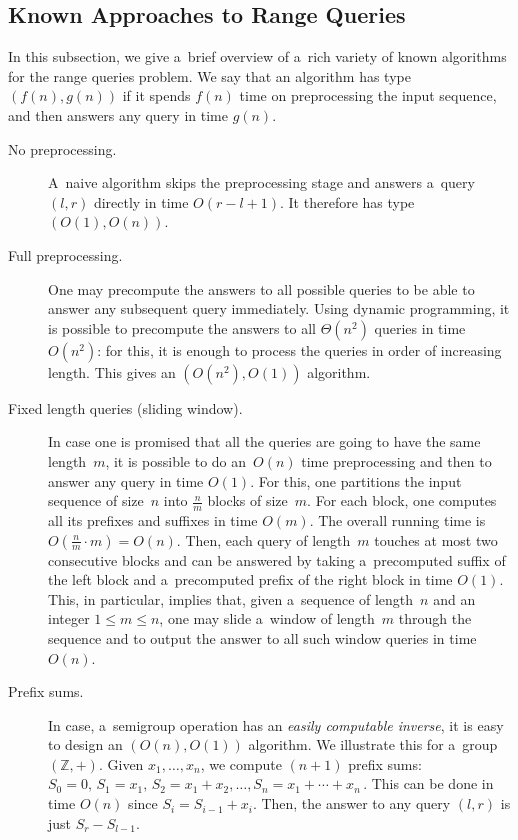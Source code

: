 \subsection{Known Approaches to Range Queries}\label{subsec:approaches}
In this subsection, we give a~brief overview of a~rich variety of known algorithms for the range queries problem. We say that an algorithm has type $(f(n), g(n))$ if it spends $f(n)$ time on preprocessing the input sequence, and then answers any query in time $g(n)$.

\begin{description}
\item[No preprocessing.] A~naive algorithm skips the preprocessing stage and answers a~query $(l,r)$ directly in time $O(r-l+1)$. It therefore has type $(O(1), O(n))$.

\item[Full preprocessing.] One may precompute the answers to all possible queries to be able to answer any subsequent query immediately. Using dynamic programming, it is possible to precompute the answers to all $\Theta(n^2)$ queries in time $O(n^2)$: for this, it is enough to process the queries in order of increasing length. This gives an $(O(n^2), O(1))$ algorithm.

\item[Fixed length queries (sliding window).] In case one is promised that all the queries are going to have the same length~$m$, it is possible to do an~$O(n)$ time preprocessing and then to answer any query in time $O(1)$. For this, one partitions the input sequence of size~$n$ into $\frac nm$ blocks of size~$m$. For each block, one computes all its prefixes and suffixes in time $O(m)$. The overall running time is $O(\frac nm \cdot m)=O(n)$. Then, each query of length~$m$ touches at most two consecutive blocks and can be answered by taking a~precomputed suffix of the left block and a~precomputed prefix of the right block in time $O(1)$. This, in particular, implies that, given a~sequence of length~$n$ and an integer $1 \le m \le n$, one may slide a~window of length~$m$ through the sequence and to output the answer to all such window queries in time $O(n)$.


\item[Prefix sums.] In case, a~semigroup operation has an {\em easily computable inverse}, it is easy to design an $(O(n), O(1))$ algorithm. We illustrate this for a~group $(\mathbb{Z}, +)$. Given $x_1, \dotsc, x_n$, we compute $(n+1)$ prefix sums:
\(S_0=0,\, S_1=x_1,\, S_2=x_1+x_2, \dotsc, S_n=x_1+\dotsb+x_n\,.\)
This can be done in time $O(n)$ since $S_i=S_{i-1}+x_i$. Then, the answer to any query $(l,r)$ is just $S_r-S_{l-1}$.


\end{description}

